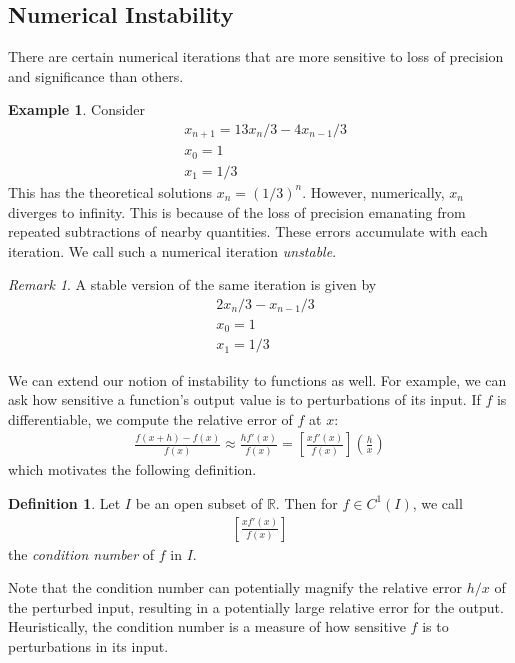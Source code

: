 \documentclass[12pt]{article}
\newcommand{\rr}{\mathbb{R}}
\theoremstyle{plain}
\theoremstyle{definition}
\newtheorem*{definition}{Definition}
\newtheorem*{example}{Example}
\theoremstyle{remark}
\newtheorem*{remark}{Remark}
\numberwithin{equation}{section}  %
\begin{document}
\subsection{Numerical Instability}
There are certain numerical iterations that are more sensitive
to loss of precision and significance than others.
\begin{example}
Consider
\begin{align*}
& x_{n+1} = 13x_n/3 - 4x_{n-1}/3
\\
& x_0 = 1
\\
& x_1 = 1/3
\end{align*}
This has the theoretical solutions $x_n = (1/3)^n$. However, numerically,
$x_n$ diverges to infinity. This is because of the loss of precision
emanating from repeated subtractions of nearby quantities. These
errors accumulate with each iteration. We call such a numerical iteration
\emph{unstable}.
\end{example}
\begin{remark}
A stable version of the same iteration is given by
\begin{align*}
& 2 x_n /3 - x_{n-1}/3
\\
& x_0 = 1
\\
& x_1 = 1/3
\end{align*}
\end{remark}
We can extend our notion of instability to functions as well.
For example, we can ask how sensitive a function's output value is
to perturbations of its input. If $f$ is differentiable, we compute
the relative error of $f$ at $x$:
\begin{align*}
\frac{f(x + h) - f(x)}{f(x)} \approx \frac{h f'(x)}{f(x)} = 
\left[ \frac{x f'(x)}{f(x)}\right]\left( \frac{h}{x}\right)
\end{align*}
which motivates the following definition.
\begin{definition}
Let $I$ be an open subset of $\rr$. Then for $f \in C^1(I)$, 
we call 
\begin{align*}
\left[ \frac{x f'(x)}{f(x)}\right]
\end{align*}
the \emph{condition number} of $f$ in $I$.
\end{definition}
Note that the condition number can potentially magnify
the relative error $h/x$ of the perturbed input, resulting
in a potentially large relative error for the output. Heuristically,
the condition number is a measure of how sensitive $f$ is to perturbations
in its input.
\end{document}
